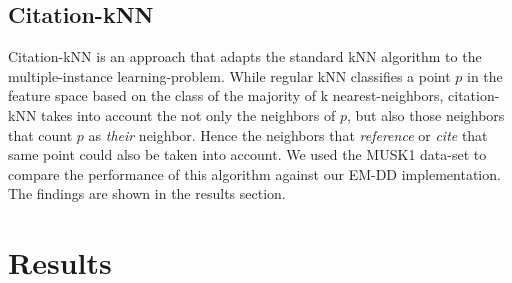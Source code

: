 \documentclass[conference]{IEEEtran}
\begin{document}
\subsection{Citation-kNN}

Citation-kNN\cite{wang2000solving} is an approach that adapts the standard kNN algorithm to the multiple-instance learning-problem. While regular kNN classifies a point $p$ in the feature space based on the class of the majority of k nearest-neighbors, citation-kNN takes into account the not only the neighbors of $p$, but also those neighbors that count $p$ as \textit{their} neighbor. Hence the neighbors that \textit{reference} or \textit{cite} that same point could also be taken into account. We used the MUSK1 data-set to compare the performance of this algorithm against our EM-DD implementation. The findings are shown in the results section.

\section{Results}

\begin{table}[t]
\centering
\caption{Comparison of accuracy on MUSK1 data-set between EM-DD implementations and other MIL algorithms}
\label{musk1-comparison}
\end{table}
\end{document}
